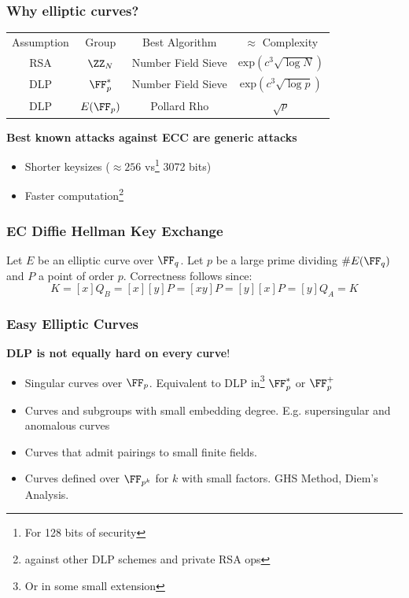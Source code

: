 \documentclass{beamer}
\begin{document}
\begin{frame}
    \frametitle{Why elliptic curves?}
    \pause
    \begin{center}
        \begin{tabular}{c c c c}
            Assumption & Group   & Best Algorithm & $\approx$ Complexity \\
            RSA        & $\ZZ_N$ & Number Field Sieve & $\mathrm{exp}(c ^3\sqrt{\log N})$ \\
            DLP        & $\FF^*_p$ & Number Field Sieve & $\mathrm{exp}(c ^3\sqrt{\log p})$ \\
            DLP        & $E(\FF_p)$ & Pollard Rho & $\sqrt{p}$ \\
        \end{tabular}
    \end{center}
    \pause
    \textbf{Best known attacks against ECC are generic attacks}
    \pause
    \begin{itemize}
        \item Shorter keysizes ($\approx 256$ vs\footnote{For 128 bits of security} 3072 bits)
        \item Faster computation\footnote{against other DLP schemes and private RSA ops}
    \end{itemize}
\end{frame}

\begin{frame}
    \frametitle{EC Diffie Hellman Key Exchange}
    Let $E$ be an elliptic curve over $\FF_q$. Let $p$ be a large prime dividing $\#E(\FF_q)$ and $P$ a point of order $p$. 
    \pause
    \pause
    Correctness follows since:
    \[ K = [x]Q_B = [x][y]P = [xy]P = [y][x]P = [y]Q_A = K \]

\end{frame}

\begin{frame}
    \frametitle{Easy Elliptic Curves}
    \textbf{DLP is not equally hard on every curve}!
    \begin{itemize}
        \item<1-> Singular curves over $\FF_p$. Equivalent to DLP in\footnote{Or in some small extension} $\FF_p^*$ or $\FF_p^+$
        \item<2-> Curves and subgroups with small embedding degree. E.g. supersingular and anomalous curves
        \item<3-> Curves that admit pairings to small finite fields.
        \item<4-> Curves defined over $\FF_{p^k}$ for $k$ with small factors. GHS Method, Diem's Analysis.
    \end{itemize}
\end{frame}
\end{document}
